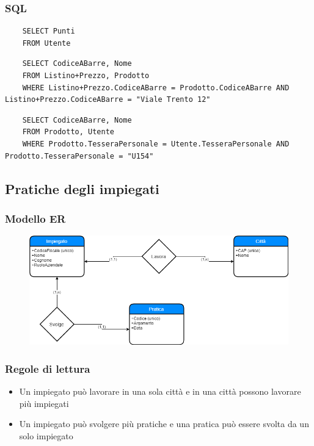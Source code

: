 \documentclass{article}
\begin{document}
	\subsubsection{SQL}
	\begin{verbatim}
	SELECT Punti
	FROM Utente
	\end{verbatim}
	\begin{verbatim}
	SELECT CodiceABarre, Nome
	FROM Listino+Prezzo, Prodotto
	WHERE Listino+Prezzo.CodiceABarre = Prodotto.CodiceABarre AND Listino+Prezzo.CodiceABarre = "Viale Trento 12"
	\end{verbatim}
	\begin{verbatim}
	SELECT CodiceABarre, Nome
	FROM Prodotto, Utente
	WHERE Prodotto.TesseraPersonale = Utente.TesseraPersonale AND Prodotto.TesseraPersonale = "U154"
	\end{verbatim}
	
	\pagebreak
	\subsection{Pratiche degli impiegati}
	\subsubsection{Modello ER}
	\begin{figure}[h!]
		\centering
		\includegraphics[scale=0.5]{images/ImpiegatiPratica.png}
	\end{figure}
	\subsubsection{Regole di lettura}
	\begin{itemize}
		\item Un impiegato può lavorare in una sola città e in una città possono lavorare più impiegati
		\item Un impiegato può svolgere più pratiche e una pratica può essere svolta da un solo impiegato
	\end{itemize}
\end{document}
